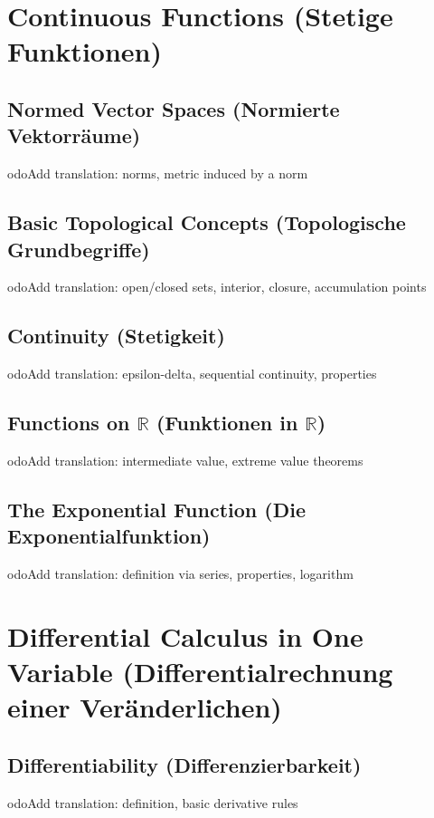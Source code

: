 \documentclass[12pt,a4paper]{article}
\newcommand{\R}{\mathbb{R}}
\theoremstyle{plain}
\theoremstyle{definition}
\theoremstyle{remark}
\begin{document}
\section{Continuous Functions (Stetige Funktionen)}

\subsection{Normed Vector Spaces (Normierte Vektorräume)}
	odo{Add translation: norms, metric induced by a norm}

\subsection{Basic Topological Concepts (Topologische Grundbegriffe)}
	odo{Add translation: open/closed sets, interior, closure, accumulation points}

\subsection{Continuity (Stetigkeit)}
	odo{Add translation: epsilon-delta, sequential continuity, properties}

\subsection{Functions on $\R$ (Funktionen in $\R$)}
	odo{Add translation: intermediate value, extreme value theorems}

\subsection{The Exponential Function (Die Exponentialfunktion)}
	odo{Add translation: definition via series, properties, logarithm}

\section{Differential Calculus in One Variable (Differentialrechnung einer Veränderlichen)}

\subsection{Differentiability (Differenzierbarkeit)}
	odo{Add translation: definition, basic derivative rules}
\end{document}
